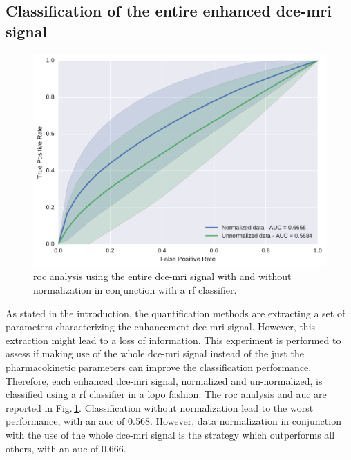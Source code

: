 \subsection{Classification of the entire enhanced \acs*{dce}-\acs*{mri} signal}

\begin{figure}
  \centering
  \includegraphics[width=0.7\linewidth]{03_experiments/figures/rf.pdf}
  \caption{\acs*{roc} analysis using the entire \ac{dce}-\ac{mri} signal with and without normalization in conjunction with a \acs*{rf} classifier.}
  \label{fig:rfnormdcesignal}
\end{figure}

As stated in the introduction, the quantification methods are extracting a set of parameters characterizing the enhancement \ac{dce}-\ac{mri} signal.
However, this extraction might lead to a loss of information.
This experiment is performed to assess if making use of the whole \ac{dce}-\ac{mri} signal instead of the just the pharmacokinetic parameters can improve the classification performance.
Therefore, each enhanced \ac{dce}-\ac{mri} signal, normalized and un-normalized, is classified using a \ac{rf} classifier in a \ac{lopo} fashion.
The \ac{roc} analysis and \ac{auc} are reported in Fig.\,\ref{fig:rfnormdcesignal}.
Classification without normalization lead to the worst performance, with an \ac{auc} of 0.568.
However, data normalization in conjunction with the use of the whole \ac{dce}-\ac{mri} signal is the strategy which outperforms all others, with an \ac{auc} of 0.666.

